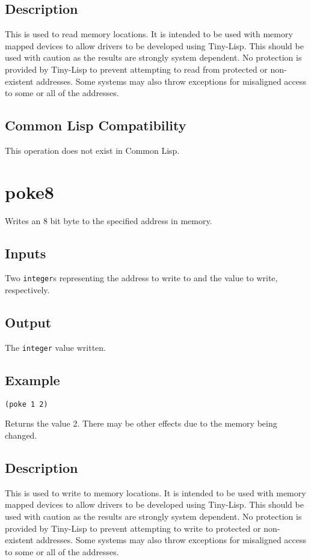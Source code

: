 \documentclass[10pt, openany]{book}
\newcommand{\datatype}[1]{\texttt{#1}}
\newcommand{\tl}{Tiny-Lisp}
\newcommand{\cl}{Common Lisp}
\begin{document}
\subsection{Description}
This is used to read memory locations.  It is intended to be used with memory mapped devices to allow drivers to be developed using \tl{}.  This should be used with caution as the results are strongly system dependent.  No protection is provided by \tl{} to prevent attempting to read from protected or non-existent addresses.  Some systems may also throw exceptions for misaligned access to some or all of the addresses.
\subsection{Common Lisp Compatibility}
This operation does not exist in \cl.

\section{poke8}
Writes an 8 bit byte to the specified address in memory.
\subsection{Inputs}
Two \datatype{integer}s representing the address to write to and the value to write, respectively.
\subsection{Output}
The \datatype{integer} value written.
\subsection{Example}
\begin{lstlisting}
(poke 1 2)
\end{lstlisting}
Returns the value 2.  There may be other effects due to the memory being changed.
\subsection{Description}
This is used to write to memory locations.  It is intended to be used with memory mapped devices to allow drivers to be developed using \tl{}.  This should be used with caution as the results are strongly system dependent.  No protection is provided by \tl{} to prevent attempting to write to protected or non-existent addresses.  Some systems may also throw exceptions for misaligned access to some or all of the addresses.
\end{document}

